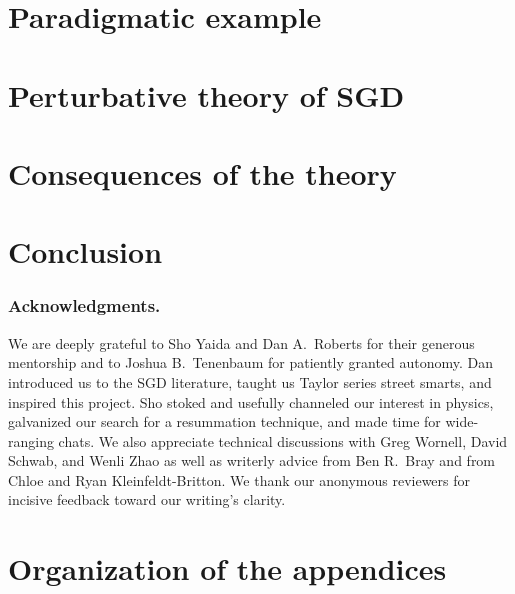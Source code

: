     \section{Paradigmatic example}\label{sect:entropic-example}
        
      
    \section{Perturbative theory of SGD}\label{sect:calculus}
        

    \newpage
    \section{Consequences of the theory}\label{sect:consequences}
        
       
    \section{Conclusion}
        

    \subsubsection{Acknowledgments.}
        We are deeply grateful to Sho Yaida and Dan A.\ Roberts for their
        generous mentorship and to Joshua B.\ Tenenbaum for patiently
        granted autonomy.  Dan introduced us to the SGD literature, taught us
        Taylor series street smarts, and inspired this project.  Sho stoked and
        usefully channeled our interest in physics, galvanized our search for a
        resummation technique, and made time for wide-ranging chats.  We also
        appreciate technical discussions with Greg Wornell, David Schwab, and
        Wenli Zhao as well as writerly advice from Ben R.\ Bray and
        from Chloe and Ryan
        Kleinfeldt-Britton.
        We thank our anonymous reviewers for incisive feedback toward our
        writing's clarity.
    
    
    
    \appendix

    \newpage
    \section*{Organization of the appendices}
        

